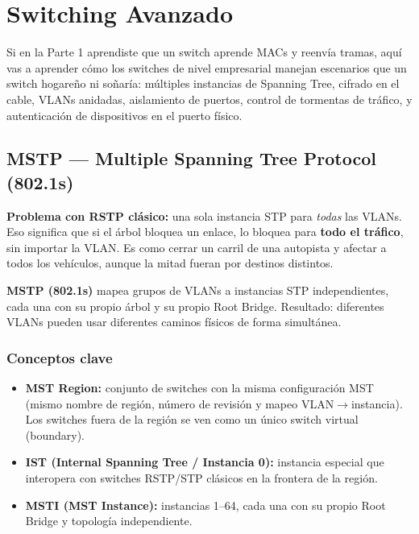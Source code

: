 
\chapter{ Switching Avanzado}

Si en la Parte 1 aprendiste que un switch aprende MACs y reenvía tramas, aquí vas a aprender
cómo los switches de nivel empresarial manejan escenarios que un switch hogareño ni soñaría:
múltiples instancias de Spanning Tree, cifrado en el cable, VLANs anidadas, aislamiento de
puertos, control de tormentas de tráfico, y autenticación de dispositivos en el puerto físico.

\section{ MSTP — Multiple Spanning Tree Protocol (802.1s)}

\begin{concepto}
\textbf{Problema con RSTP clásico:} una sola instancia STP para \emph{todas} las VLANs.
Eso significa que si el árbol bloquea un enlace, lo bloquea para \textbf{todo el tráfico},
sin importar la VLAN. Es como cerrar un carril de una autopista y afectar a todos los
vehículos, aunque la mitad fueran por destinos distintos.

\textbf{MSTP (802.1s)} mapea grupos de VLANs a instancias STP independientes, cada una
con su propio árbol y su propio Root Bridge. Resultado: diferentes VLANs pueden usar
diferentes caminos físicos de forma simultánea.
\end{concepto}

\subsection{Conceptos clave}

\begin{itemize}
    \item \textbf{MST Region:} conjunto de switches con la misma configuración MST
          (mismo nombre de región, número de revisión y mapeo VLAN$\to$instancia). Los
          switches fuera de la región se ven como un único switch virtual (boundary).
    \item \textbf{IST (Internal Spanning Tree / Instancia 0):} instancia especial que
          interopera con switches RSTP/STP clásicos en la frontera de la región.
    \item \textbf{MSTI (MST Instance):} instancias 1--64, cada una con su propio Root
          Bridge y topología independiente.
\end{itemize}

